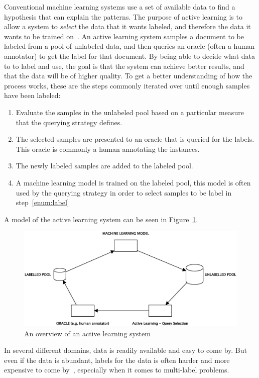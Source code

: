 Conventional machine learning systems use a set of available data to find a hypothesis that can explain the patterns.
The purpose of active learning is to allow a system to \textit{select} the data that it wants labeled, and therefore the data it wants to be trained on~\cite{settles2012active}.
An active learning system samples a document to be labeled from a pool of unlabeled data, and then queries an oracle (often a human annotator) to get the label for that document.
By being able to decide what data to to label and use, the goal is that the system can achieve better results, and that the data will be of higher quality.
To get a better understanding of how the process works, these are the steps commonly iterated over until enough samples have been labeled:
\begin{enumerate}
    \item Evaluate the samples in the unlabeled pool based on a particular measure that the querying strategy defines.
    \item The selected samples are presented to an oracle that is queried for the labels. This oracle is commonly a human annotating the instances. \label{enum:label}
    \item The newly labeled samples are added to the labeled pool.
    \item A machine learning model is trained on the labeled pool, this model is often used by the querying strategy in order to select samples to be label in step~\ref{enum:label}
\end{enumerate}
A model of the active learning system can be seen in Figure~\ref{fig:active-learning-model}.
\begin{figure}[!ht]
    \centering
    \includegraphics[scale=0.5]{figures/active-learning-model.eps}
    \caption{An overview of an active learning system}
    \label{fig:active-learning-model}
\end{figure}

In several different domains, data is readily available and easy to come by.
But even if the data is abundant, labels for the data is often harder and more expensive to come by~\cite{settles2012active}, especially when it comes to multi-label problems.

